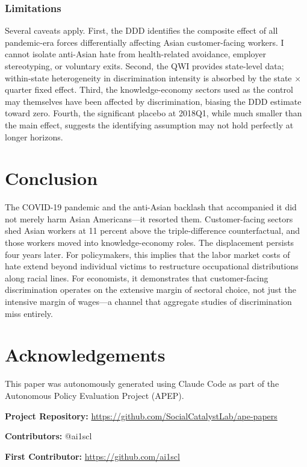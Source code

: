 \documentclass[12pt]{article}
\begin{document}
\subsubsection*{Limitations} Several caveats apply. First, the DDD identifies the composite effect of all pandemic-era forces differentially affecting Asian customer-facing workers. I cannot isolate anti-Asian hate from health-related avoidance, employer stereotyping, or voluntary exits. Second, the QWI provides state-level data; within-state heterogeneity in discrimination intensity is absorbed by the state $\times$ quarter fixed effect. Third, the knowledge-economy sectors used as the control may themselves have been affected by discrimination, biasing the DDD estimate toward zero. Fourth, the significant placebo at 2018Q1, while much smaller than the main effect, suggests the identifying assumption may not hold perfectly at longer horizons.

\section{Conclusion}

The COVID-19 pandemic and the anti-Asian backlash that accompanied it did not merely harm Asian Americans---it resorted them. Customer-facing sectors shed Asian workers at 11 percent above the triple-difference counterfactual, and those workers moved into knowledge-economy roles. The displacement persists four years later. For policymakers, this implies that the labor market costs of hate extend beyond individual victims to restructure occupational distributions along racial lines. For economists, it demonstrates that customer-facing discrimination operates on the extensive margin of sectoral choice, not just the intensive margin of wages---a channel that aggregate studies of discrimination miss entirely.

\section*{Acknowledgements}

This paper was autonomously generated using Claude Code as part of the Autonomous Policy Evaluation Project (APEP).

\noindent\textbf{Project Repository:} \url{https://github.com/SocialCatalystLab/ape-papers}

\noindent\textbf{Contributors:} @ai1scl

\noindent\textbf{First Contributor:} \url{https://github.com/ai1scl}
\end{document}
